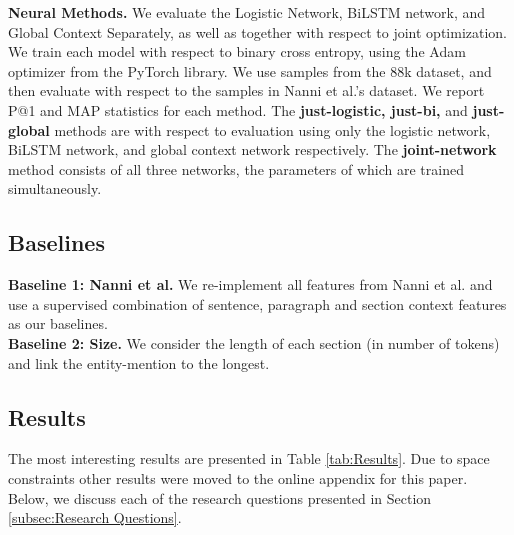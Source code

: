 \textbf{Neural Methods.}
We evaluate the Logistic Network, BiLSTM network, and Global Context Separately, as well as together with respect to joint optimization. We train each model with respect to binary cross entropy, using the Adam optimizer from the PyTorch library. We use samples from the 88k dataset, and then evaluate with respect to the samples in Nanni et al.'s dataset. We report P@1 and MAP statistics for each method. The \textbf{just-logistic, just-bi,} and \textbf{just-global} methods are with respect to evaluation using only the logistic network, BiLSTM network, and global context network respectively. The \textbf{joint-network} method consists of all three networks, the parameters of which are trained simultaneously.

\subsection{Baselines}
\label{subsec:Baselines}

\textbf{Baseline 1: Nanni et al.} We re-implement all features from Nanni et al. \cite{nanni2018entity} and use a supervised combination of sentence, paragraph and section context features as our baselines. \\
\textbf{Baseline 2: Size.} We consider the length of each section (in number of tokens) and link the entity-mention to the longest. \\

\subsection{Results}
\label{subsec:Results}
The most interesting results are presented in Table \ref{tab:Results}. Due to space constraints other results were moved to the online appendix for this paper. Below, we discuss each of the research questions presented in Section \ref{subsec:Research Questions}.


